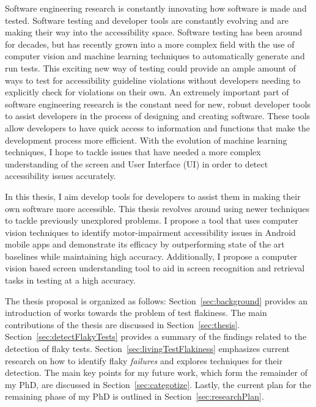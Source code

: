 Software engineering research is constantly innovating how software is made and tested. Software testing and developer tools are constantly evolving and are making their way into the accessibility space. Software testing has been around for decades, but has recently grown into a more complex field with the use of computer vision and machine learning techniques to automatically generate and run tests. This exciting new way of testing could provide an ample amount of ways to test for accessibility guideline violations without developers needing to explicitly check for violations on their own. An extremely important part of software engineering research is the constant need for new, robust developer tools to assist developers in the process of designing and creating software. These tools allow developers to have quick access to information and functions that make the development process more efficient. With the evolution of machine learning techniques, I hope to tackle issues that have needed a more complex understanding of the screen and User Interface (UI) in order to detect accessibility issues accurately. 

In this thesis, I aim develop tools for developers to assist them in making their own software more accessible. This thesis revolves around using newer techniques to tackle previously unexplored problems. I propose a tool that uses computer vision techniques to identify motor-impairment accessibility issues in Android mobile apps and demonstrate its efficacy by outperforming state of the art baselines while maintaining high accuracy. Additionally, I propose a computer vision based screen understanding tool to aid in screen recognition and retrieval tasks in testing at a high accuracy. 

The thesis proposal is organized as follows: Section~\ref{sec:background} provides an introduction of works towards the problem of test flakiness. The main contributions of the thesis are discussed in Section~\ref{sec:thesis}. Section~\ref{sec:detectFlakyTests} provides a summary of the findings related to the detection of flaky tests. Section~\ref{sec:livingTestFlakiness} emphasizes current research on how to identify flaky \emph{failures} and explores techniques for their detection. The main key points for my future work, which form the remainder of my PhD, are discussed in Section~\ref{sec:categotize}. Lastly, the current plan for the remaining phase of my PhD is outlined in Section~\ref{sec:researchPlan}.
